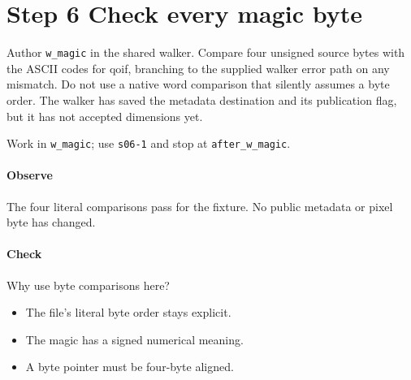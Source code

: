 \section{Step 6 Check every magic byte}\label{qoi-s06}
Author \texttt{w\_magic} in the shared walker. Compare four unsigned source bytes with the ASCII codes for qoif, branching to the supplied walker error path on any mismatch. Do not use a native word comparison that silently assumes a byte order. The walker has saved the metadata destination and its publication flag, but it has not accepted dimensions yet.

Work in \texttt{w\_magic}; use \texttt{s06-1} and stop at \texttt{after\_w\_magic}.

\paragraph{Observe} The four literal comparisons pass for the fixture. No public metadata or pixel byte has changed.

\paragraph{Check} Why use byte comparisons here?
\begin{itemize}
  \item[A.] The file’s literal byte order stays explicit.
  \item[B.] The magic has a signed numerical meaning.
  \item[C.] A byte pointer must be four-byte aligned.
\end{itemize}
